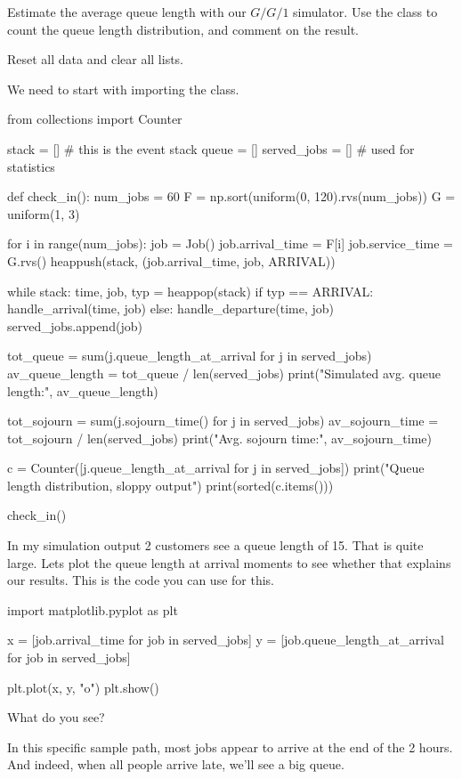 \begin{exercise}
  Estimate the average queue length with our $G/G/1$ simulator. Use the  class to count the queue length distribution, and comment on the result.
\begin{hint}
Reset all data and clear all lists.
\end{hint}

\begin{solution}
We need to start with importing the  class.
\begin{pyverbatim}
from collections import Counter

stack = []  # this is the event stack
queue = []
served_jobs = []  # used for statistics


def check_in():
    num_jobs = 60
    F = np.sort(uniform(0, 120).rvs(num_jobs))
    G = uniform(1, 3)

    for i in range(num_jobs):
        job = Job()
        job.arrival_time = F[i]
        job.service_time = G.rvs()
        heappush(stack, (job.arrival_time, job, ARRIVAL))

    while stack:
        time, job, typ = heappop(stack)
        if typ == ARRIVAL:
            handle_arrival(time, job)
        else:
            handle_departure(time, job)
            served_jobs.append(job)

    tot_queue = sum(j.queue_length_at_arrival for j in served_jobs)
    av_queue_length = tot_queue / len(served_jobs)
    print("Simulated avg. queue length:", av_queue_length)

    tot_sojourn = sum(j.sojourn_time() for j in served_jobs)
    av_sojourn_time = tot_sojourn / len(served_jobs)
    print("Avg. sojourn time:", av_sojourn_time)

    c = Counter([j.queue_length_at_arrival for j in served_jobs])
    print("Queue length distribution, sloppy output")
    print(sorted(c.items()))


check_in()
\end{pyverbatim}
  \end{solution}
\end{exercise}



\begin{exercise}
In my simulation output 2 customers see a queue length of 15. That is quite large. Lets plot the queue length at arrival moments to see whether that explains our results. 
This is the code you can use for this.
\begin{pyverbatim}
import matplotlib.pyplot as plt

x = [job.arrival_time for job in served_jobs]
y = [job.queue_length_at_arrival for job in served_jobs]

plt.plot(x, y, "o")
plt.show()
\end{pyverbatim}
What do you see? 
\begin{solution}
  In this specific sample path, most jobs appear to arrive at the end of the 2 hours. And indeed, when all people arrive late, we'll see a big queue. 
\end{solution}

\end{exercise}



